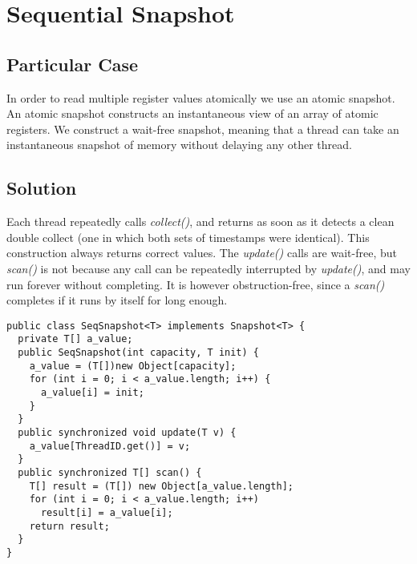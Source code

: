 


\section{\textbf{Sequential Snapshot}}



\subsection{Particular Case}
\par
In order to read multiple register values atomically we use an atomic snapshot.
An atomic snapshot constructs an instantaneous view of an array of atomic registers. We construct a wait-free snapshot, meaning that a thread can take an instantaneous snapshot of memory without delaying any other thread.
\par



\subsection{Solution}
\par
Each thread repeatedly calls \textit{collect()}, and returns as soon as it detects a clean double collect (one in which both sets of timestamps were identical). This construction always returns correct values. The \textit{update()} calls are wait-free, but \textit{scan()} is not because any call can be repeatedly interrupted by \textit{update()}, and may run forever without completing. It is however obstruction-free, since a \textit{scan()} completes if it runs by itself for long enough.
\begin{lstlisting}[frame=single,breaklines=true]
public class SeqSnapshot<T> implements Snapshot<T> {
  private T[] a_value;
  public SeqSnapshot(int capacity, T init) {
    a_value = (T[])new Object[capacity];
    for (int i = 0; i < a_value.length; i++) {
      a_value[i] = init;
    }
  }
  public synchronized void update(T v) {
    a_value[ThreadID.get()] = v;
  }
  public synchronized T[] scan() {
    T[] result = (T[]) new Object[a_value.length];
    for (int i = 0; i < a_value.length; i++)
      result[i] = a_value[i];
    return result;
  }
}
\end{lstlisting}
\par


